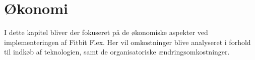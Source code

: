 \chapter{Økonomi}
I dette kapitel bliver der fokuseret på de økonomiske aspekter ved implementeringen af Fitbit Flex. Her vil omkostninger blive analyseret i forhold til indkøb af teknologien, samt de organisatoriske ændringsomkostninger.